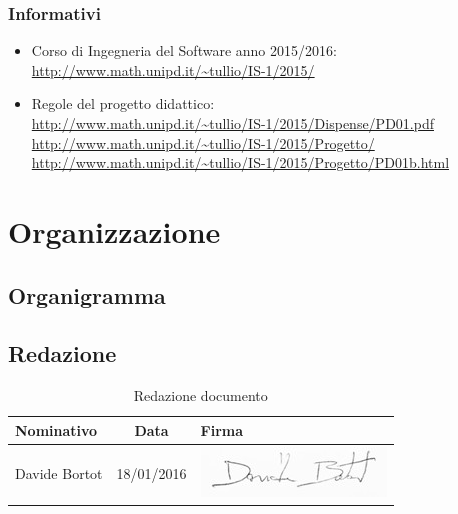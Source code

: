 \documentclass[a4paper,11pt]{article}
\begin{document}
		\subsubsection{Informativi}
		\begin{itemize}
			\item Corso di Ingegneria del Software anno 2015/2016:\\
			\url{http://www.math.unipd.it/~tullio/IS-1/2015/}
			\item Regole del progetto didattico:\\
			\url{http://www.math.unipd.it/~tullio/IS-1/2015/Dispense/PD01.pdf}
			\url{http://www.math.unipd.it/~tullio/IS-1/2015/Progetto/}\\
			\url{http://www.math.unipd.it/~tullio/IS-1/2015/Progetto/PD01b.html}
		\end{itemize}
	\pagebreak
	
	\newpage
	\section{Organizzazione}	
	\subsection{Organigramma}
	\subsection*{Redazione}
	\begin{table}[h!]
		\begin{tabularx}{\textwidth}{XcX}
			\textbf{Nominativo} & \textbf{Data} &\hspace{20 mm}  \textbf{Firma}\\
			\midrule
			Davide Bortot & 18/01/2016 & \hspace{20 mm} \includegraphics[scale=0.35]{../Firme/db.jpg} \\
			\midrule
		\end{tabularx}
	\caption{Redazione documento}
	\end{table}
\end{document}
